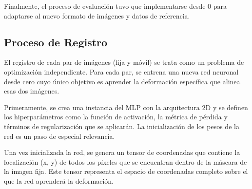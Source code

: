 Finalmente, el proceso de evaluación tuvo que implementarse desde 0 para adaptarse al nuevo formato de imágenes y datos de referencia.

\subsection{Proceso de Registro}
\label{subsec:Proceso de Registro}

El registro de cada par de imágenes (fija y móvil) se trata como un problema de optimización independiente. Para cada par, se entrena una nueva red neuronal desde cero cuyo único objetivo es aprender la deformación específica que alinea esas dos imágenes.

Primeramente, se crea una instancia del MLP con la arquitectura 2D y se definen los hiperparámetros como la función de activación, la métrica de pérdida y términos de regularización que se aplicarán. La inicialización de los pesos de la red es un paso de especial relevancia.

Una vez inicializada la red, se genera un tensor de coordenadas que contiene la localización (x, y) de todos los píxeles que se encuentran dentro de la máscara de la imagen fija. Este tensor representa el espacio de coordenadas completo sobre el que la red aprenderá la deformación.

